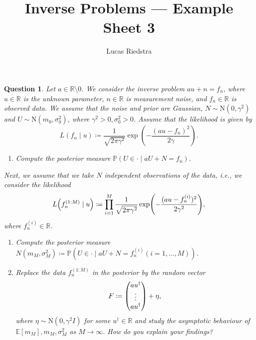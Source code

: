 \documentclass{article}
\title{Inverse Problems --- Example Sheet 3}
\author{Lucas Riedstra}
\theoremstyle{plain}
\newtheorem{question}{Question}
\theoremstyle{remark}
\newcommand{\Bb}{\mathbb}
\newcommand{\Rm}{\mathrm}
\newcommand{\PP}{\Bb P}
\newcommand{\RR}{\Bb R}
\newcommand{\EE}{\Bb E}
\newcommand{\D}{^\dagger}
\newcommand\ceq\coloneqq %
\begin{document}
\maketitle

\setcounter{question}{2}

\begin{question}
	Let $a \in \RR\setminus \qty{0}$. We consider the inverse problem $au + n = f_n$, where $u \in \RR$ is the unknown parameter, $n \in \RR$ is measurement noise, and $f_n \in \RR$ is observed data. We assume that the noise and prior are Gaussian, $N \sim \Rm N(0, \gamma^2)$ and $U \sim \Rm N(m_0, \sigma_0^2)$, where $\gamma^2 > 0, \sigma_0^2 > 0$. Assume that the likelihood is given by
	\[
	L(f_n \mid u) \ceq \frac1{\sqrt{2\pi\gamma^2}} \exp(- \frac{(au - f_n)^2}{2\gamma}).
	\]
	\begin{enumerate}
		\item[(i)] Compute the posterior measure $\PP(U \in \cdot \mid aU + N = f_n)$. 
	\end{enumerate}
Next, we assume that we take $N$ independent observations of the data, i.e., we consider the likelihood
\[
L\qty(f_n^{(1:M)} \mid u) \ceq \prod_{i=1}^M \frac{1}{\sqrt{2\pi \gamma^2}} \exp(- \frac{(au - f_n^{(i)})^2}{2\gamma^2}), 
\]
where $f_n^{(i)} \in \RR$. 
\begin{enumerate}
	\item[(ii)] Compute the posterior measure $N(m_M, \sigma_M^2) \ceq \PP(U \in \cdot \mid aU + N = f_n^{(i)} (i = 1, \dotsc, M))$. 
	\item[(iii)] Replace the data $f_n^{(1:M)}$ in the posterior by the random vector
	\[
	F \ceq \mqty(a u\D \\ \vdots \\ a u\D) + \eta,
	\]
	where $\eta \sim \Rm N(0, \gamma^2 I)$ for some $u\D \in \RR$ and study the asymptotic behaviour of $\EE[m_M], m_M, \sigma_M^2$ as $M \to\infty$. How do you explain your findings?
\end{enumerate}
\end{question}
\end{document}
